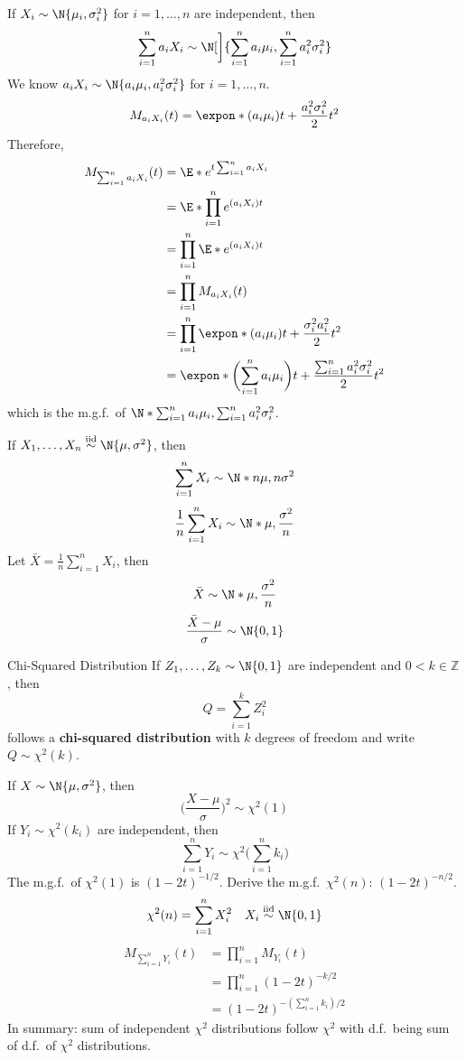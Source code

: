 If $ X_i \sim \N{\mu_i,\sigma_i^2} $ for $ i=1,\ldots,n $
are independent, then
\[ \sum_{i=1}^{n} a_i X_i \sim \N[\bigg]{\sum_{i=1}^{n} a_i\mu_i,
        \sum_{i=1}^{n} a_i^2\sigma_i^2} \]
We know $ a_i X_i \sim \N{a_i\mu_i,a_i^2\sigma_i^2} $
for $ i=1,\ldots, n $.
\[ M_{a_i X_i}(t)=\expon*{(a_i\mu_i)t+\frac{a_i^2\sigma_i^2}{2}t^2} \]
Therefore,
\begin{align*}
    M_{\sum_{i=1}^{n} a_i X_i}(t)
     & =\E*{e^{t \sum_{i=1}^{n} a_i X_i}}                                 \\
     & =\E*{\prod_{i=1}^n e^{(a_i X_i)t}}                                 \\
     & =\prod_{i=1}^n\E*{e^{(a_i X_i)t}}                                  \\
     & =\prod_{i=1}^n M_{a_i X_i}(t)                                      \\
     & =\prod_{i=1}^n \expon*{(a_i\mu_i)t+\frac{\sigma_i^2 a_i^2}{2}t^2 } \\
     & =\expon*{\biggl(\sum_{i=1}^{n} a_i\mu_i\biggr)t
        +\frac{\sum_{i=1}^{n} a_i^2\sigma_i^2}{2}t^2}
\end{align*}
which is the m.g.f.\ of
$ \N*{\sum_{i=1}^{n} a_i\mu_i,\sum_{i=1}^{n} a_i^2\sigma_i^2} $.

If $ X_1,\ldots,X_n \stackrel{\text{iid}}{\sim} \N{\mu,\sigma^2} $,
then
\[ \sum_{i=1}^{n} X_i \sim \N*{n\mu,n\sigma^2} \]
\[ \frac{1}{n} \sum_{i=1}^{n} X_i \sim \N*{\mu,\frac{\sigma^2}{n}} \]
Let $ \displaystyle \bar{X}=\frac{1}{n} \sum_{i=1}^{n}X_i $, then
\[ \bar{X}\sim \N*{\mu,\frac{\sigma^2}{n} } \]
\[ \frac{\bar{X}-\mu}{\sigma}\sim \N{0,1}  \]
\begin{Definition}{Chi-Squared Distribution}{}
    If $ Z_1,\ldots,Z_k \sim \N{0,1} $ are independent
    and $ 0<k\in\mathbb{Z} $, then
    \[ Q=\sum_{i=1}^{k} Z_i^2 \]
    follows a \textbf{chi-squared distribution}
    with $ k $ degrees of freedom and write
    $ Q \sim \chi^2(k) $.
\end{Definition}
If $ X \sim \N{\mu,\sigma^2} $, then
\[ \biggl(\frac{X-\mu}{\sigma}\biggr)^2 \sim \chi^2(1)  \]
If $ Y_i \sim \chi^2(k_i) $ are independent, then
\[ \sum_{i=1}^{n} Y_i \sim \chi^2\biggl(\sum_{i=1}^{n} k_i\biggr) \]
The m.g.f.\ of $ \chi^2(1) $ is $ (1-2t)^{-1/2} $. Derive
the m.g.f.\ $ \chi^2(n) $: $ (1-2t)^{-n/2} $.
\[ \chi^2(n)=\sum_{i=1}^{n} X_i^2\quad X_i\stackrel{\text{iid}}{\sim}\N{0,1}\]
\begin{align*}
    M_{\sum_{i=1}^{n} Y_i}(t)
     & =\prod_{i=1}^n M_{Y_i}(t)         \\
     & =\prod_{i=1}^n(1-2t)^{-k/2}       \\
     & =(1-2t)^{-(\sum_{i=1}^{n} k_i)/2}
\end{align*}
In summary: sum of independent $ \chi^2 $ distributions
follow $ \chi^2 $ with d.f.\ being sum of d.f.\ of
$ \chi^2 $ distributions.

